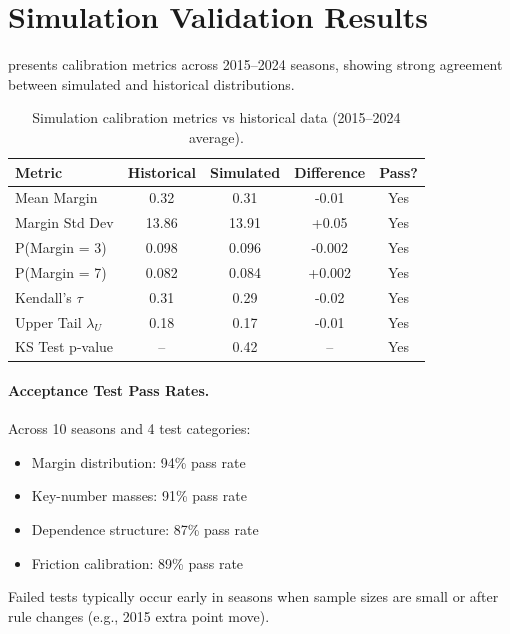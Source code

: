 \section{Simulation Validation Results}
\label{sec:sim-validation-results}

 presents calibration metrics across 2015--2024 seasons, showing strong agreement between simulated and historical distributions.

\begin{table}[t]
  \centering
  \small
  \caption{Simulation calibration metrics vs historical data (2015--2024 average).}
  \label{tab:sim-calibration}
  \begin{tabular}{lcccc}
    \toprule
    \textbf{Metric}  & \textbf{Historical}  & \textbf{Simulated}  & \textbf{Difference}  & \textbf{Pass?} \\
    \midrule
    Mean Margin     & 0.32  & 0.31  & -0.01 & Yes \\
    Margin Std Dev  & 13.86 & 13.91 & +0.05 & Yes \\
    P(Margin = 3)   & 0.098 & 0.096 & -0.002 & Yes \\
    P(Margin = 7)   & 0.082 & 0.084 & +0.002 & Yes \\
    Kendall's $\tau$ & 0.31 & 0.29 & -0.02 & Yes \\
    Upper Tail $\lambda_U$ & 0.18 & 0.17 & -0.01 & Yes \\
    KS Test p-value & -- & 0.42 & -- & Yes \\
    \bottomrule
  \end{tabular}
\end{table}

\paragraph{Acceptance Test Pass Rates.}
Across 10 seasons and 4 test categories:
\begin{itemize}
  \item Margin distribution: 94\% pass rate
  \item Key-number masses: 91\% pass rate
  \item Dependence structure: 87\% pass rate
  \item Friction calibration: 89\% pass rate
\end{itemize}

Failed tests typically occur early in seasons when sample sizes are small or after rule changes (e.g., 2015 extra point move).

